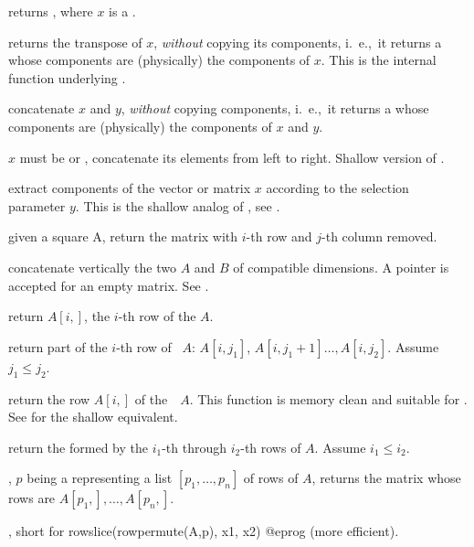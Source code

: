  returns , where $x$
is a .

 returns the transpose of $x$, \emph{without}
copying its components, i.~e.,~it returns a  whose components are
(physically) the components of $x$. This is the internal function underlying
.

 concatenate $x$ and $y$, \emph{without}
copying components, i.~e.,~it returns a  whose components are
(physically) the components of $x$ and $y$.

$x$ must be  or , concatenate
its elements from left to right. Shallow version of .

 extract components
of the vector or matrix $x$ according to the selection parameter $y$.
This is the shallow analog of , see .

 given a square  A,
return the matrix with $i$-th row and $j$-th column removed.

 concatenate vertically the two  $A$
and $B$ of compatible dimensions. A  pointer is accepted for an
empty matrix. See .

 return $A[i,]$, the $i$-th row of the 
$A$.

 return part of the $i$-th
row of ~$A$: $A[i,j_1]$, $A[i,j_1+1]\dots,A[i,j_2]$. Assume $j_1
\leq j_2$.

 return the row $A[i,]$ of
the~~$A$. This function is memory clean and suitable for
. See  for the shallow equivalent.

 return the 
formed by the $i_1$-th through $i_2$-th rows of  $A$. Assume $i_1
\leq i_2$.

, $p$ being a 
representing a list $[p_1,\dots,p_n]$ of rows of  $A$, returns the
matrix whose rows are $A[p_1,],\dots, A[p_n,]$.

, short for
\bprog
  rowslice(rowpermute(A,p), x1, x2)
@eprog\noindent
(more efficient).

